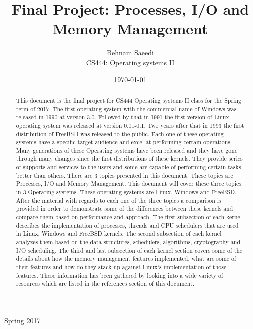 \documentclass[journal,10pt,onecolumn,compsoc,letterpaper,draftclsnofoot,table,xcdraw]{IEEEtran} \usepackage[margin=0.75in]{geometry}
\title{Final Project: Processes, I/O and Memory Management}
\author{Behnam Saeedi\\ CS444: Operating systems II}
\date{\today}
\begin{document}
\maketitle
\begin{centering}
Spring 2017
\begin{abstract}
\noindent This document is the final project for CS444 Operating systems II class for the Spring term of 2017. The first operating system with the commercial name of Windows was released in 1990 at version 3.0. Followed by that in 1991 the first version of Linux operating system was released at version 0.01-0.1. Two years after that in 1993 the first distribution of FreeBSD was released to the public. Each one of these operating systems have a specific target audience and excel at performing certain operations. Many generations of these Operating systems have been released and they have gone through many changes since the first distributions of these kernels. They provide series of supports and services to the users and some are capable of performing certain tasks better than others. There are 3 topics presented in this document. These topics are Processes, I/O and Memory Management. This document will cover these three topics in 3 Operating systems. These operating systems are Linux, Windows and FreeBSD. After the material with regards to each one of the three topics a comparison is provided in order to demonstrate some of the differences between these kernels and compare them based on performance and approach. The first subsection of each kernel describes the implementation of processes, threads and CPU schedulers that are used in Linux, Windows and FreeBSD kernels. The second subsection of each kernel analyzes them based on the data structures, schedulers, algorithms, cryptography and I/O scheduling. The third and last subsection of each kernel section covers some of the details about how the memory management features implemented, what are some of their features and how do they stack up against Linux's implementation of those features. These information has been gathered by looking into a wide variety of resources which are listed in the references section of this document.
\end{abstract}
\end{centering}
\newpage
\tableofcontents
\newpage 
\end{document}
